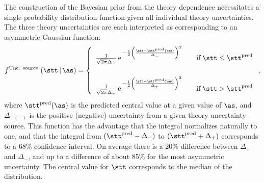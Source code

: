 The construction of the Bayesian prior from the theory dependence
necessitates a single probability distribution function given all
individual theory uncertainties. 
%
The three theory uncertainties are each interpreted as corresponding
to an asymmetric Gaussian function:
%
\begin{equation}
f^{\text{Unc. source}} \; (\stt \,|\, \as) = 
\left\{
    \begin{array}{ll}
        \frac{1}{\sqrt{2\pi} \Delta_-}
        \, \text{e}  \,^{-\frac12 \left(
        \frac{
            \stt - \stt^{\text{pred}}(\as)
            }{
            \Delta_-
            }
        \right)^2 }
        & \quad \text{if} \; \stt \leq \stt^{\text{pred}}
        \\[20pt]
        \frac{1}{\sqrt{2\pi} \Delta_+}
        \, \text{e}  \,^{ -\frac12\left(
        \frac{
            \stt - \stt^{\text{pred}}(\as)
            }{
            \Delta_+
            }        
        \right)^2 }
        & \quad \text{if} \; \stt > \stt^{\text{pred}}
    \end{array}
    \right.
,
\label{eq:asymgauss}
\end{equation}
%
where $\stt^{\text{pred}}(\as)$ is the predicted central value at a
given value of $\as$, and $\Delta_{+(-)}$ is the positive (negative)
uncertainty from a given theory uncertainty source. This function has
the advantage that the integral normalizes naturally to one, and that
the integral from $(\stt^{\text{pred}}-\Delta_-)$ to
$(\stt^{\text{pred}}+\Delta_+)$ corresponds to a 68\% 
confidence interval.  
% 
On average there is a 20\% difference between $\Delta_+$ and $\Delta_-$,
and up to a difference of about 85\% for the most asymmetric uncertainty.
%
The central value for $\stt$ corresponds to the median of the
distribution.

